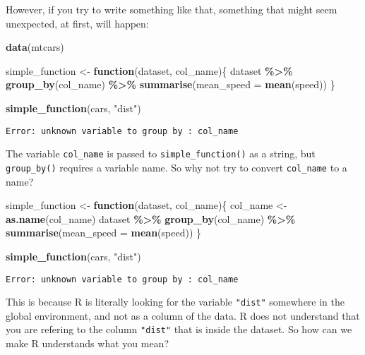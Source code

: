 \documentclass[
]{article}
\newenvironment{Shaded}{\begin{snugshade}}{\end{snugshade}}
\newcommand{\ControlFlowTok}[1]{\textcolor[rgb]{0.13,0.29,0.53}{\textbf{#1}}}
\newcommand{\DataTypeTok}[1]{\textcolor[rgb]{0.13,0.29,0.53}{#1}}
\newcommand{\KeywordTok}[1]{\textcolor[rgb]{0.13,0.29,0.53}{\textbf{#1}}}
\newcommand{\NormalTok}[1]{#1}
\newcommand{\OperatorTok}[1]{\textcolor[rgb]{0.81,0.36,0.00}{\textbf{#1}}}
\newcommand{\StringTok}[1]{\textcolor[rgb]{0.31,0.60,0.02}{#1}}
\begin{document}
However, if you try to write something like that, something that might seem unexpected, at first,
will happen:

\begin{Shaded}
\begin{Highlighting}[]
\KeywordTok{data}\NormalTok{(mtcars)}

\NormalTok{simple\_function \textless{}{-}}\StringTok{ }\ControlFlowTok{function}\NormalTok{(dataset, col\_name)\{}
\NormalTok{  dataset }\OperatorTok{\%\textgreater{}\%}
\StringTok{    }\KeywordTok{group\_by}\NormalTok{(col\_name) }\OperatorTok{\%\textgreater{}\%}
\StringTok{    }\KeywordTok{summarise}\NormalTok{(}\DataTypeTok{mean\_speed =} \KeywordTok{mean}\NormalTok{(speed))}
\NormalTok{\}}


\KeywordTok{simple\_function}\NormalTok{(cars, }\StringTok{"dist"}\NormalTok{)}
\end{Highlighting}
\end{Shaded}

\begin{verbatim}
Error: unknown variable to group by : col_name
\end{verbatim}

The variable \texttt{col\_name} is passed to \texttt{simple\_function()} as a string, but \texttt{group\_by()} requires a
variable name. So why not try to convert \texttt{col\_name} to a name?

\begin{Shaded}
\begin{Highlighting}[]
\NormalTok{simple\_function \textless{}{-}}\StringTok{ }\ControlFlowTok{function}\NormalTok{(dataset, col\_name)\{}
\NormalTok{  col\_name \textless{}{-}}\StringTok{ }\KeywordTok{as.name}\NormalTok{(col\_name)}
\NormalTok{  dataset }\OperatorTok{\%\textgreater{}\%}
\StringTok{    }\KeywordTok{group\_by}\NormalTok{(col\_name) }\OperatorTok{\%\textgreater{}\%}
\StringTok{    }\KeywordTok{summarise}\NormalTok{(}\DataTypeTok{mean\_speed =} \KeywordTok{mean}\NormalTok{(speed))}
\NormalTok{\}}


\KeywordTok{simple\_function}\NormalTok{(cars, }\StringTok{"dist"}\NormalTok{)}
\end{Highlighting}
\end{Shaded}

\begin{verbatim}
Error: unknown variable to group by : col_name
\end{verbatim}

This is because R is literally looking for the variable \texttt{"dist"} somewhere in the global
environment, and not as a column of the data. R does not understand that you are refering to the
column \texttt{"dist"} that is inside the dataset. So how can we make R understands what you mean?
\end{document}
